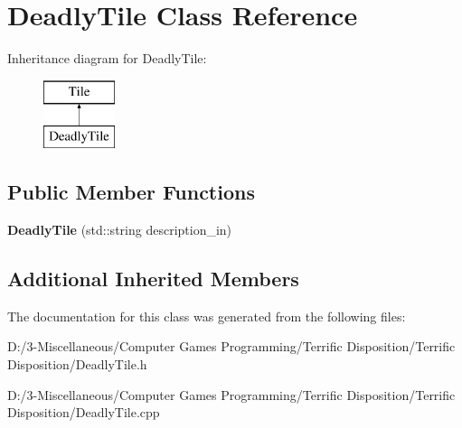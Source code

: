 \hypertarget{class_deadly_tile}{}\section{Deadly\+Tile Class Reference}
\label{class_deadly_tile}
Inheritance diagram for Deadly\+Tile\+:\begin{figure}[H]
\begin{center}
\leavevmode
\includegraphics[height=2.000000cm]{class_deadly_tile}
\end{center}
\end{figure}
\subsection*{Public Member Functions}
\begin{DoxyCompactItemize}
\item 
\mbox{\label{class_deadly_tile_ab526434cdae2d931685818ae689beebe}} 
{\bfseries Deadly\+Tile} (std\+::string description\+\_\+in)
\end{DoxyCompactItemize}
\subsection*{Additional Inherited Members}


The documentation for this class was generated from the following files\+:\begin{DoxyCompactItemize}
\item 
D\+:/3-\/\+Miscellaneous/\+Computer Games Programming/\+Terrific Disposition/\+Terrific Disposition/Deadly\+Tile.\+h\item 
D\+:/3-\/\+Miscellaneous/\+Computer Games Programming/\+Terrific Disposition/\+Terrific Disposition/Deadly\+Tile.\+cpp\end{DoxyCompactItemize}
